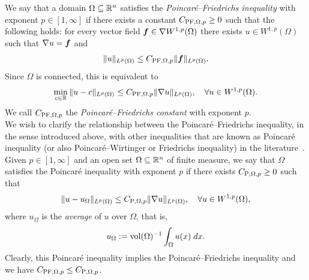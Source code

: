 \documentclass[10pt,a4paper]{article}
\begin{document}
We say that a domain $\Omega \subseteq {\mathbb R}^{n}$ satisfies the \emph{Poincar\'e--Friedrichs inequality} with exponent $p \in [1,\infty]$
if there exists a constant $C_{{\rm PF},\Omega,p} \geq 0$ such that the following holds:
for every vector field $\bm{f} \in \nabla W^{1,p}(\Omega)$ there exists $u \in W^{1,p}(\Omega)$
such that $\nabla u = \bm{f}$ and 
\begin{align}\label{math:inequalitypf:gradient}
    \| u \|_{L^{p}(\Omega)}
    \leq 
    C_{{\rm PF},\Omega,p} 
    \| \bm{f} \|_{L^{p}(\Omega)}
    .
\end{align}
Since $\Omega$ is connected, this is equivalent to  
\begin{align*}
    \min_{ c \in {\mathbb R} } \| u - c \|_{L^{p}(\Omega)}
    \leq 
    C_{{\rm PF},\Omega,p} 
    \| \nabla u \|_{L^{p}(\Omega)},
    \quad 
    \forall 
    u \in W^{1,p}(\Omega)
    .
\end{align*}
We call $C_{{\rm PF},\Omega,p}$ the \emph{Poincar\'e--Friedrichs constant} with exponent $p$. 
\\

We wish to clarify the relationship between the Poincar\'e--Friedrichs inequality, in the sense introduced above, with other inequalities that are known as Poincar\'e inequality (or also Poincar\'e--Wirtinger or Friedrichs inequality) in the literature~\cite{ern2021finite}. Given $p \in [1,\infty]$ and an open set $\Omega \subseteq {\mathbb R}^{n}$ of finite measure, 
we say that $\Omega$ satisfies the Poincar\'e inequality with exponent $p$ 
if there exists $C_{{{\rm P}},\Omega,p} \geq 0$ such that 
\begin{align*}
    \| u - u_{\Omega} \|_{L^{p}(\Omega)}
    \leq 
    C_{{\rm P},\Omega,p} 
    \| \nabla u \|_{L^{p}(\Omega)}
    ,
    \quad 
    \forall u \in W^{1,p}(\Omega)
    ,
\end{align*}
where $u_{\Omega}$ is the \emph{average} of $u$ over $\Omega$, that is,
\begin{align*}
    u_{\Omega} := \operatorname{vol}(\Omega)^{-1} \int_{\Omega} u(x) \;dx.
\end{align*}
Clearly, this Poincar\'e inequality implies the Poincar\'e--Friedrichs inequality and we have $C_{{{\rm PF}},\Omega,p} \leq C_{{\rm P},\Omega,p}$. 
\end{document}
